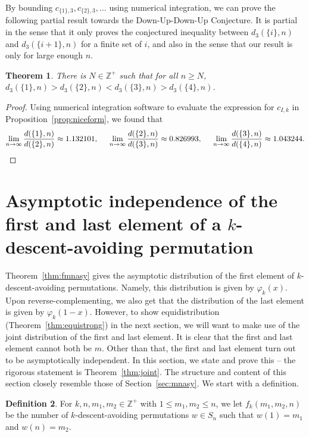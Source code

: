 \documentclass{amsart}
\newtheorem{theorem}{Theorem}[section]
\theoremstyle{definition}
\newtheorem{definition}[theorem]{Definition}
\begin{document}
By bounding $c_{\{1\},3}, c_{\{2\},3}, \ldots$ using numerical integration, we can prove the following partial result towards the Down-Up-Down-Up Conjecture. It is partial in the sense that it only proves the conjectured inequality between $d_3(\{i\},n)$ and $d_3(\{i+1\},n)$ for a finite set of $i$, and also in the sense that our result is only for large enough $n$.

\begin{theorem}
There is $N\in \mathbb{Z}^+$ such that for all $n\geq N$, $d_3(\{1\},n)>d_3(\{2\},n)<d_3(\{3\},n)>d_3(\{4\},n)$.
\end{theorem}
\begin{proof}
Using numerical integration software to evaluate the expression for $c_{I,k}$ in Proposition~\ref{prop:niceform}, we found that 
\[\lim_{n\to \infty} \frac{d(\{1\},n)}{d(\{2\},n)}\approx 1.132101, \hspace{5mm} \lim_{n\to \infty} \frac{d(\{2\},n)}{d(\{3\},n)}\approx 0.826993, \hspace{5mm} \lim_{n\to \infty}\frac{d(\{3\},n)}{d(\{4\},n)}\approx 1.043244.\]
\end{proof}



\section{Asymptotic independence of the first and last element of a $k$-descent-avoiding permutation}\label{sec:joint}
Theorem~\ref{thm:fmnasy} gives the asymptotic distribution of the first element of $k$-descent-avoiding permutations. Namely, this distribution is given by $\varphi_k(x)$. Upon reverse-complementing, we also get that the distribution of the last element is given by $\varphi_k(1-x)$. However, to show equidistribution (Theorem~\ref{thm:equistrong}) in the next section, we will want to make use of the joint distribution of the first and last element. It is clear that the first and last element cannot both be $m$. Other than that, the first and last element turn out to be asymptotically independent. In this section, we state and prove this -- the rigorous statement is Theorem~\ref{thm:joint}. The structure and content of this section closely resemble those of Section~\ref{sec:mnasy}. We start with a definition.

\begin{definition}
For $k,n,m_1,m_2\in \mathbb{Z}^+$ with $1\leq m_1,m_2\leq n$, we let $f_k(m_1,m_2,n)$ be the number of $k$-descent-avoiding permutations $w\in S_n$ such that $w(1)=m_1$ and $w(n)=m_2$.
\end{definition}
\end{document}
